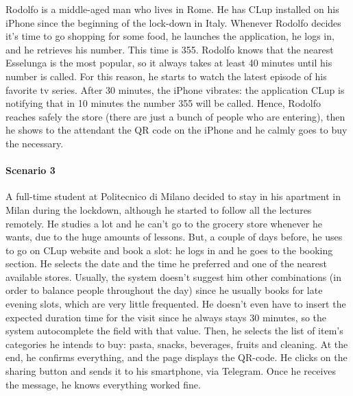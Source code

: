 \documentclass[table, 12pt]{article}
\begin{document}
Rodolfo is a middle-aged man who lives in Rome. He has CLup installed on his iPhone since the beginning of the lock-down in Italy. Whenever Rodolfo decides it's time to go shopping for some food, he launches the application, he logs in, and he retrieves his number. This time is 355. Rodolfo knows that the nearest Esselunga is the most popular, so it always takes at least 40 minutes until his number is called. For this reason, he starts to watch the latest episode of his favorite tv series. After 30 minutes, the iPhone vibrates: the application CLup is notifying that in 10 minutes the number 355 will be called. Hence, Rodolfo reaches safely the store (there are just a bunch of people who are entering), then he shows to the attendant the QR code on the iPhone and he calmly goes to buy the necessary. \\



\paragraph{Scenario 3}

A full-time student at Politecnico di Milano decided to stay in his apartment in Milan during the lockdown, although he started to follow all the lectures remotely. He studies a lot and he can't go to the grocery store whenever he wants, due to the huge amounts of lessons. But, a couple of days before, he uses to go on CLup website and book a slot: he logs in and he goes to the booking section. He selects the date and the time he preferred and one of the nearest available stores. Usually, the system doesn't suggest him other combinations (in order to balance people throughout the day) since he usually books for late evening slots, which are very little frequented. He doesn't even have to insert the expected duration time for the visit since he always stays 30 minutes, so the system autocomplete the field with that value. Then, he selects the list of item's categories he intends to buy: pasta, snacks, beverages, fruits and cleaning. At the end, he confirms everything, and the page displays the QR-code. He clicks on the sharing button and sends it to his smartphone, via Telegram. Once he receives the message, he knows everything worked fine.\\
\end{document}
